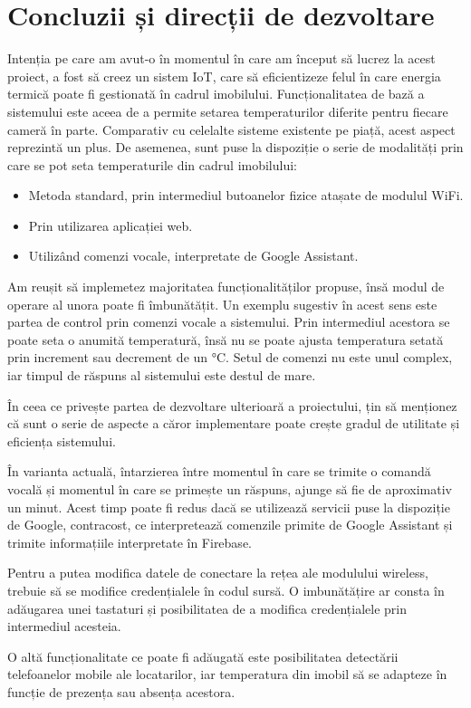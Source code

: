 \chapter{Concluzii și direcții de dezvoltare}\label{ch:6concluzii}

	Intenția pe care am avut-o în momentul în care am început să lucrez la acest proiect, a fost să creez un sistem IoT, care să eficientizeze felul în care energia termică poate fi gestionată în cadrul imobilului. Funcționalitatea de bază a sistemului este aceea de a permite setarea temperaturilor diferite pentru fiecare cameră în parte. Comparativ cu celelalte sisteme existente pe piață, acest aspect reprezintă un plus. De asemenea, sunt puse la dispoziție o serie de modalități prin care se pot seta temperaturile din cadrul imobilului:
	\begin{itemize}
  	\setlength{\itemindent}{2em}
		\itemsep0em
		\item Metoda standard, prin intermediul butoanelor fizice atașate de modulul WiFi.
		\item Prin utilizarea aplicației web.
		\item Utilizând comenzi vocale, interpretate de Google Assistant. 
	\end{itemize} 

\vspace{1em}
	Am reușit să implemetez majoritatea funcționalităților propuse, însă modul de operare al unora poate fi îmbunătățit. Un exemplu sugestiv în acest sens este partea de control prin comenzi vocale a sistemului. Prin intermediul acestora se poate seta o anumită temperatură, însă nu se poate ajusta temperatura setată prin increment sau decrement de un °C. Setul de comenzi nu este unul complex, iar timpul de răspuns al sistemului este destul de mare. 

\vspace{1em}
	În ceea ce privește partea de dezvoltare ulterioară a proiectului, țin să menționez că sunt o serie de aspecte a căror implementare poate crește gradul de utilitate și eficiența sistemului.

	În varianta actuală, întarzierea între momentul în care se trimite o comandă vocală și momentul în care se primește un răspuns, ajunge să fie de aproximativ un minut. Acest timp poate fi redus dacă se utilizează servicii puse la dispoziție de Google, contracost, ce interpretează comenzile primite de Google Assistant și trimite informațiile interpretate în Firebase. 

	Pentru a putea modifica datele de conectare la rețea ale modulului wireless, trebuie să se modifice credențialele în codul sursă. O imbunătățire ar consta în adăugarea unei tastaturi și posibilitatea de a modifica credențialele prin intermediul acesteia. 

	O altă funcționalitate ce poate fi adăugată este posibilitatea detectării telefoanelor mobile ale locatarilor, iar temperatura din imobil să se adapteze în funcție de prezența sau absența acestora.
	  
